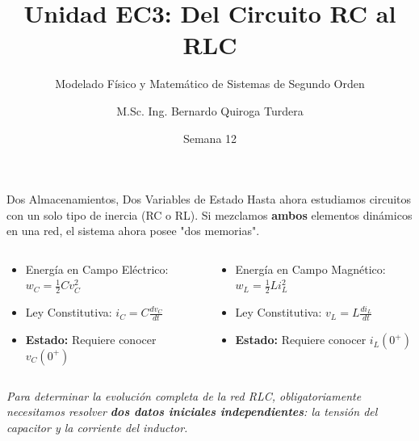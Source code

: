 \documentclass[aspectratio=169, 10pt]{beamer}
\title[Del RC al RLC]{Unidad EC3: Del Circuito RC al RLC}
\subtitle{Modelado Físico y Matemático de Sistemas de Segundo Orden}
\author[B. Quiroga Turdera]{M.Sc. Ing. Bernardo Quiroga Turdera}
\institute[UCB Tarija]{Universidad Católica Boliviana ``San Pablo'' --- Sede Tarija}
\date{Semana 12}
\begin{document}
\begin{frame}
    \titlepage
\end{frame}

\begin{frame}{Dos Almacenamientos, Dos Variables de Estado}
    Hasta ahora estudiamos circuitos con un solo tipo de inercia (RC o RL). Si mezclamos \textbf{ambos} elementos dinámicos en una red, el sistema ahora posee "dos memorias".
    
    \vspace{0.4cm}
    \begin{columns}[T]
        \begin{tcolorbox}[colback=white, colframe=ucbblue, title=\textbf{El Capacitor}]
            \begin{itemize}
                \item Energía en Campo Eléctrico: $w_C = \frac{1}{2} C v_C^2$
                \item Ley Constitutiva: $i_C = C \frac{dv_C}{dt}$
                \item \textbf{Estado:} Requiere conocer $v_C(0^+)$
            \end{itemize}
        \end{tcolorbox}

        \begin{tcolorbox}[colback=white, colframe=ucbblue, title=\textbf{El Inductor}]
            \begin{itemize}
                \item Energía en Campo Magnético: $w_L = \frac{1}{2} L i_L^2$
                \item Ley Constitutiva: $v_L = L \frac{di_L}{dt}$
                \item \textbf{Estado:} Requiere conocer $i_L(0^+)$
            \end{itemize}
        \end{tcolorbox}
    \end{columns}
    \vspace{0.4cm}
    \textit{Para determinar la evolución completa de la red RLC, obligatoriamente necesitamos resolver \textbf{dos datos iniciales independientes}: la tensión del capacitor y la corriente del inductor.}
\end{frame}
\end{document}
